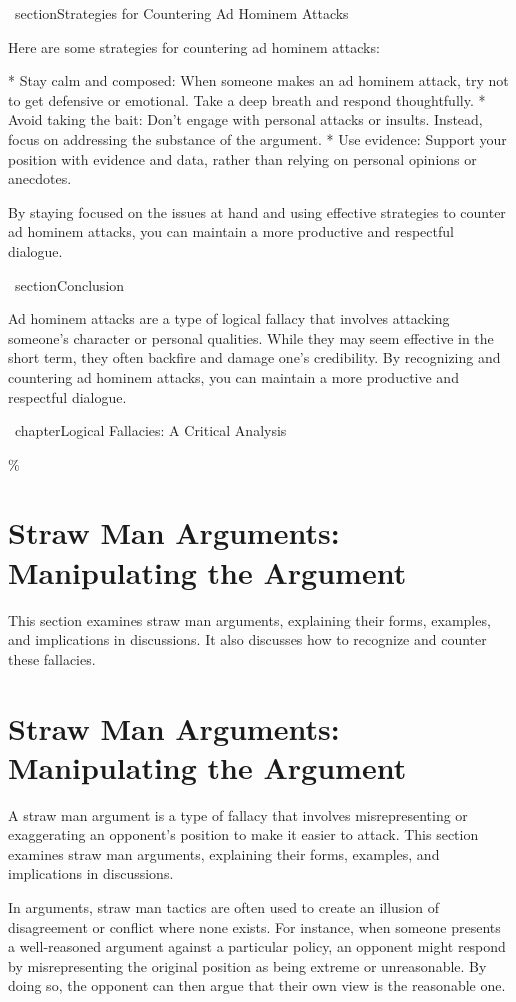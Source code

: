 \documentclass{report}%
\begin{document}
{{{\ section{Strategies for Countering Ad Hominem Attacks}

 Here are some strategies for countering ad hominem attacks:

*   Stay calm and composed: When someone makes an ad hominem attack, try not to get defensive or emotional. Take a deep breath and respond thoughtfully.
*   Avoid taking the bait: Don't engage with personal attacks or insults. Instead, focus on addressing the substance of the argument.
*   Use evidence: Support your position with evidence and data, rather than relying on personal opinions or anecdotes.

 By staying focused on the issues at hand and using effective strategies to counter ad hominem attacks, you can maintain a more productive and respectful dialogue.

\ section{Conclusion}

 Ad hominem attacks are a type of logical fallacy that involves attacking someone's character or personal qualities. While they may seem effective in the short term, they often backfire and damage one's credibility. By recognizing and countering ad hominem attacks, you can maintain a more productive and respectful dialogue.

\ chapter{Logical Fallacies: A Critical Analysis}

\%
\section{Straw Man Arguments: Manipulating the Argument}%
This section examines straw man arguments, explaining their forms, examples, and implications in discussions. It also discusses how to recognize and counter these fallacies.

%
\section{Straw Man Arguments: Manipulating the Argument}

A straw man argument is a type of fallacy that involves misrepresenting or exaggerating an opponent's position to make it easier to attack. This section examines straw man arguments, explaining their forms, examples, and implications in discussions.

In arguments, straw man tactics are often used to create an illusion of disagreement or conflict where none exists. For instance, when someone presents a well-reasoned argument against a particular policy, an opponent might respond by misrepresenting the original position as being extreme or unreasonable. By doing so, the opponent can then argue that their own view is the reasonable one.

}}}
\end{document}
